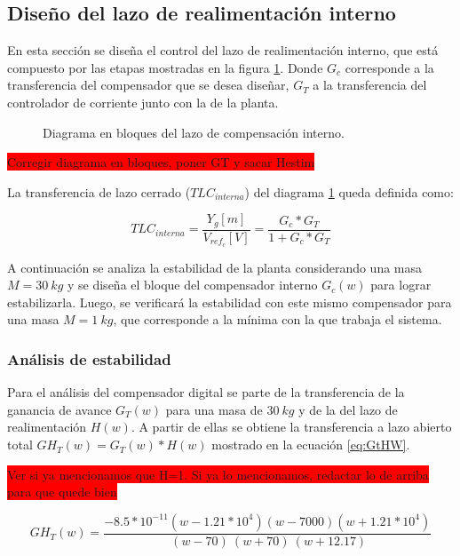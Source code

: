 \subsection{Diseño del lazo de realimentación interno}

En esta sección se diseña el control del lazo de realimentación interno, que está compuesto por las etapas mostradas en la figura \ref{fig:diag-interno_dig}. Donde $G_c$ corresponde a la transferencia del compensador que se desea diseñar, $G_{T}$ a la transferencia del controlador de corriente junto con la de la planta.

\begin{figure}[H]
	\centering
	
	\caption{Diagrama en bloques del lazo de compensación interno.}	\label{fig:diag-interno_dig}
\end{figure}

\colorbox{red}{Corregir diagrama en bloques, poner GT y sacar Hestim}

La transferencia de lazo cerrado ($TLC_{interna}$) del diagrama \ref{fig:diag-interno_dig} queda definida como:

\begin{equation}
	TLC_{interna}=\frac{Y_g[m]}{V_{ref_c}[V]}=\frac{G_c*G_T}{1+G_c*G_T}
\end{equation}

A continuación se analiza la estabilidad de la planta considerando una masa $M=30\:kg$ y se diseña el bloque del compensador interno $G_c(w)$ para lograr estabilizarla. Luego, se verificará la estabilidad con este mismo compensador para una masa $M=1\:kg$, que corresponde a la mínima con la que trabaja el sistema.

\subsubsection{Análisis de estabilidad}

 Para el análisis del compensador digital se parte de la transferencia de la ganancia de avance $G_{T}(w)$ para una masa de $30\:kg$ y de la del lazo de realimentación $H(w)$. A partir de ellas se obtiene la transferencia a lazo abierto total $GH_{T}(w)=G_{T}(w)*H(w)$ mostrado en la ecuación \ref{eq:GtHW}.

\colorbox{red}{Ver si ya mencionamos que H=1. Si ya lo mencionamos, redactar lo de arriba para que quede bien}
 
\begin{equation}
	\label{eq:GtHW}  
	GH_{T}(w)=\frac{-8.5*10^{-11}(w-1.21*10^4)(w-7000)(w+1.21*10^4)}{\ (w-70)\ (w+70)\ (w+12.17)} 
\end{equation} 


